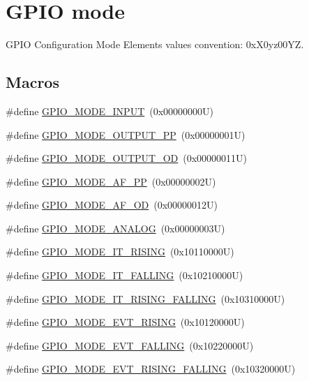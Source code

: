 \hypertarget{group___g_p_i_o__mode}{}\section{G\+P\+IO mode}
\label{group___g_p_i_o__mode}


G\+P\+IO Configuration Mode Elements values convention\+: 0x\+X0yz00\+YZ.  


\subsection*{Macros}
\begin{DoxyCompactItemize}
\item 
\#define \hyperlink{group___g_p_i_o__mode_gaf40bec3146810028a84b628d37d3b391}{G\+P\+I\+O\+\_\+\+M\+O\+D\+E\+\_\+\+I\+N\+P\+UT}~(0x00000000\+U)
\item 
\#define \hyperlink{group___g_p_i_o__mode_ga1013838a64cec2f8c88f079c449d1982}{G\+P\+I\+O\+\_\+\+M\+O\+D\+E\+\_\+\+O\+U\+T\+P\+U\+T\+\_\+\+PP}~(0x00000001\+U)
\item 
\#define \hyperlink{group___g_p_i_o__mode_ga2f91757829f6e9505ec386b840941929}{G\+P\+I\+O\+\_\+\+M\+O\+D\+E\+\_\+\+O\+U\+T\+P\+U\+T\+\_\+\+OD}~(0x00000011\+U)
\item 
\#define \hyperlink{group___g_p_i_o__mode_ga526c72c5264316fc05c775b6cad4aa6a}{G\+P\+I\+O\+\_\+\+M\+O\+D\+E\+\_\+\+A\+F\+\_\+\+PP}~(0x00000002\+U)
\item 
\#define \hyperlink{group___g_p_i_o__mode_ga282b9fd37c8ef31daba314ffae6bf023}{G\+P\+I\+O\+\_\+\+M\+O\+D\+E\+\_\+\+A\+F\+\_\+\+OD}~(0x00000012\+U)
\item 
\#define \hyperlink{group___g_p_i_o__mode_ga7a04f9ab65ad572ad20791a35009220c}{G\+P\+I\+O\+\_\+\+M\+O\+D\+E\+\_\+\+A\+N\+A\+L\+OG}~(0x00000003\+U)
\item 
\#define \hyperlink{group___g_p_i_o__mode_ga088659562e68426d9a72821ea4fd8d50}{G\+P\+I\+O\+\_\+\+M\+O\+D\+E\+\_\+\+I\+T\+\_\+\+R\+I\+S\+I\+NG}~(0x10110000\+U)
\item 
\#define \hyperlink{group___g_p_i_o__mode_gaa166210a6da3ac7e8d7504702520e522}{G\+P\+I\+O\+\_\+\+M\+O\+D\+E\+\_\+\+I\+T\+\_\+\+F\+A\+L\+L\+I\+NG}~(0x10210000\+U)
\item 
\#define \hyperlink{group___g_p_i_o__mode_ga0678e61090ed61e91a6496f22ddfb3d1}{G\+P\+I\+O\+\_\+\+M\+O\+D\+E\+\_\+\+I\+T\+\_\+\+R\+I\+S\+I\+N\+G\+\_\+\+F\+A\+L\+L\+I\+NG}~(0x10310000\+U)
\item 
\#define \hyperlink{group___g_p_i_o__mode_ga97d78b82ea178ff7a4c35aa60b4e9338}{G\+P\+I\+O\+\_\+\+M\+O\+D\+E\+\_\+\+E\+V\+T\+\_\+\+R\+I\+S\+I\+NG}~(0x10120000\+U)
\item 
\#define \hyperlink{group___g_p_i_o__mode_gadbfa532b3566783ac6c0e07c2e0ffe5e}{G\+P\+I\+O\+\_\+\+M\+O\+D\+E\+\_\+\+E\+V\+T\+\_\+\+F\+A\+L\+L\+I\+NG}~(0x10220000\+U)
\item 
\#define \hyperlink{group___g_p_i_o__mode_ga1b760771297ed2fc55a6b13071188491}{G\+P\+I\+O\+\_\+\+M\+O\+D\+E\+\_\+\+E\+V\+T\+\_\+\+R\+I\+S\+I\+N\+G\+\_\+\+F\+A\+L\+L\+I\+NG}~(0x10320000\+U)
\end{DoxyCompactItemize}


